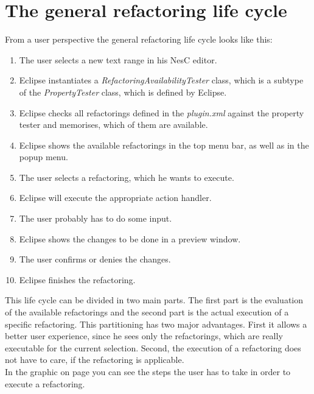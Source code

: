 \documentclass[a4paper,10pt]{report}
\begin{document}
\section{The general refactoring life cycle}
From a user perspective the general refactoring life cycle looks like this:
   \begin{enumerate}
     \item The user selects a new text range in his NesC editor.
     \item Eclipse instantiates a {\it RefactoringAvailabilityTester} class, which is a subtype of the {\it PropertyTester} class, which is defined by Eclipse.
     \item Eclipse checks all refactorings defined in the {\it plugin.xml} against the property tester and memorises, which of them are available. 
     \item Eclipse shows the available refactorings in the top menu bar, as well as in the popup menu.
     \item The user selects a refactoring, which he wants to execute.
     \item Eclipse will execute the appropriate action handler.
     \item The user probably has to do some input.
     \item Eclipse shows the changes to be done in a preview window.
     \item The user confirms or denies the changes.
     \item Eclipse finishes the refactoring.
   \end{enumerate}
This life cycle can be divided in two main parts.
The first part is the evaluation of the available refactorings and the second part is the actual execution of a specific refactoring. 
This partitioning has two major advantages.
First it allows a better user experience, since he sees only the refactorings, which are really executable for the current selection. 
Second, the execution of a refactoring does not have to care, if the refactoring is applicable.\\
In the graphic on page \pageref{UserInputSequence} you can see the steps the user has to take in order to execute a refactoring.
\end{document}
